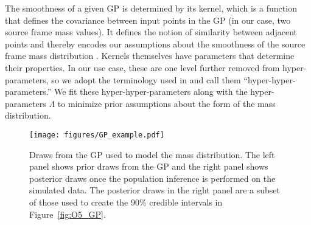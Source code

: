 \documentclass[preprint2,linenumbers]{aastex631}
\begin{document}
The smoothness of a given \ac{GP} is determined by its kernel, which is a function that defines the covariance between input points in the \ac{GP} (in our case, two source frame mass values). 
It defines the notion of similarity between adjacent points and thereby encodes our assumptions about the smoothness of the source frame mass distribution \citep{rasmussen_gaussian_2006}.
Kernels themselves have parameters that determine their properties.
In our use case, these are one level further removed from hyper-parameters, so we adopt the terminology used in \citet{callister_parameter-free_2023} and call them ``hyper-hyper-parameters.''
We fit these hyper-hyper-parameters along with the hyper-parameters $\Lambda$ to minimize prior assumptions about the form of the mass distribution.

\begin{figure*}
    \centering
    \texttt{[image: figures/GP\_example.pdf]}
    \caption{Draws from the \acf{GP} used to model the mass distribution.
    The left panel shows prior draws from the \ac{GP} and the right panel shows posterior draws once the population inference is performed on the simulated data.
    The posterior draws in the right panel are a subset of those used to create the 90\% credible intervals in Figure~\ref{fig:O5_GP}.}
    \label{fig:GP example}
\end{figure*}
\end{document}
